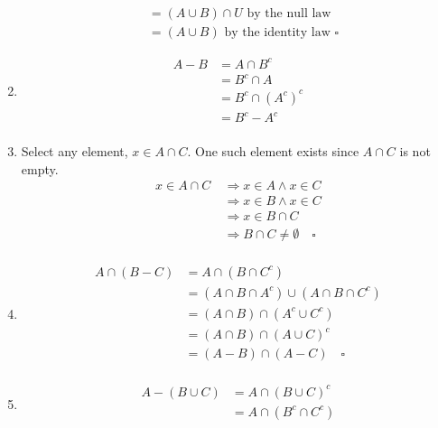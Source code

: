 \documentclass[10pt,]{book}
\theoremstyle{plain}
\theoremstyle{definition}
\theoremstyle{definition}
\theoremstyle{definition}
\begin{document}
\begin{exercisegroup}
\begin{enumerate}[label=\alph*]
\begin{equation*}
\begin{split}
            &=(A\cup B)\cap U \textrm{  by the null law}\\
              &=(A\cup B) \textrm{  by the identity law }  \square
\end{split}
	\end{equation*}%
\item\hypertarget{li-38}{}\begin{equation*}
\begin{split}
A - B & = A \cap B ^c\\
       &  =B^c\cap A\\
       &=B^c\cap (A^c)^c\\
       &=B^c-A^c\\
	\end{split}
	\end{equation*}%
\item\hypertarget{li-39}{}Select any element, \(x \in A\cap C\). One such element exists since \(A\cap C\) is not empty.
\begin{equation*}
\begin{split}
 x\in A\cap C\  &\Rightarrow x\in A \land x\in C \\
          & \Rightarrow x\in B \land x\in C \\
          & \Rightarrow x\in B\cap C \\
          & \Rightarrow B\cap C \neq \emptyset \quad \square \\
   \end{split}
	\end{equation*}%
\item\hypertarget{li-40}{}\begin{equation*}
\begin{split}
A\cap (B-C) &=A\cap (B\cap C^c) \\
				& = (A\cap B\cap A^c)\cup (A\cap B\cap C^c) \\
              & =(A\cap B)\cap (A^c\cup C^c) \\
              & =(A\cap B)\cap (A\cup C)^c \\
              & =(A-B)\cap (A-C) \quad \square\\
   \end{split}
	\end{equation*}%
\item\hypertarget{li-41}{}\begin{equation*}
\begin{split}
A-(B\cup C)& = A\cap (B\cup C)^c\\
              & =A\cap (B^c\cap C^c)\\

\end{split}
\end{equation*}
\end{enumerate}
\end{exercisegroup}
\end{document}
